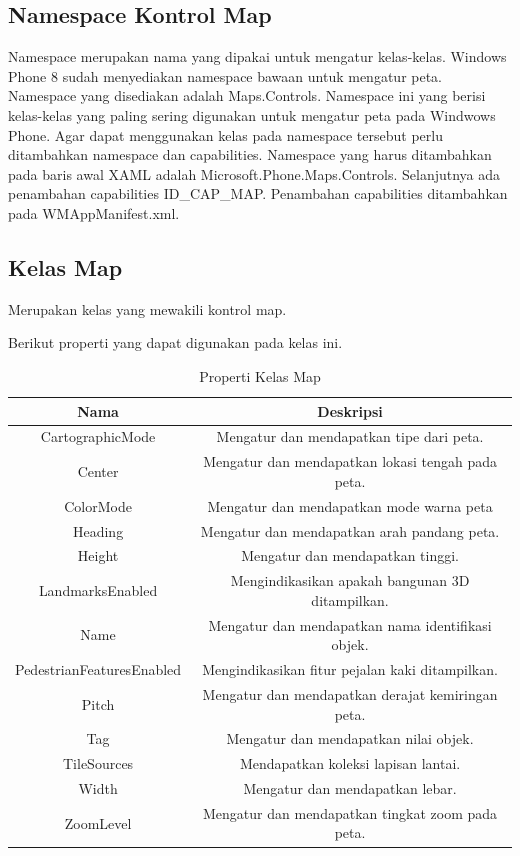 \subsection{Namespace Kontrol Map}
\label{subsec:Namespace Kontrol Map}
\hspace{0.5cm} Namespace merupakan nama yang dipakai untuk mengatur kelas-kelas. Windows Phone 8 sudah menyediakan namespace bawaan untuk mengatur peta. Namespace yang disediakan adalah Maps.Controls. Namespace ini yang berisi kelas-kelas yang paling sering digunakan untuk mengatur peta pada Windwows Phone.  Agar dapat menggunakan kelas pada namespace tersebut perlu ditambahkan namespace dan capabilities. Namespace yang harus ditambahkan pada baris awal XAML adalah Microsoft.Phone.Maps.Controls. Selanjutnya ada penambahan capabilities ID\_CAP\_MAP. Penambahan capabilities ditambahkan pada WMAppManifest.xml.

\subsection{Kelas Map}
\label{subsec:Kelas Map}
\hspace{0.5cm} Merupakan kelas yang mewakili kontrol map.

Berikut properti yang dapat digunakan pada kelas ini.
\begin{table}[h]
	\centering
		\begin{tabular}{ |c||c|}
				\hline
					Nama & Deskripsi \\ \hline
					CartographicMode & Mengatur dan mendapatkan tipe dari peta. \\ \hline
					Center & Mengatur dan mendapatkan lokasi tengah pada peta. \\ \hline
					ColorMode & Mengatur dan mendapatkan mode warna peta \\ \hline
					Heading & Mengatur dan mendapatkan arah pandang peta. \\ \hline
					Height & Mengatur dan mendapatkan tinggi. \\ \hline
					LandmarksEnabled & Mengindikasikan apakah bangunan 3D ditampilkan. \\ \hline
					Name & Mengatur dan mendapatkan nama identifikasi objek. \\ \hline
					PedestrianFeaturesEnabled & Mengindikasikan fitur pejalan kaki ditampilkan. \\ \hline
					Pitch & Mengatur dan mendapatkan derajat kemiringan peta. \\ \hline
					Tag & Mengatur dan mendapatkan nilai objek. \\ \hline
					TileSources & Mendapatkan koleksi lapisan lantai. \\ \hline
					Width & Mengatur dan mendapatkan lebar. \\ \hline
					ZoomLevel & Mengatur dan mendapatkan tingkat zoom pada peta. \\ \hline
				\hline
		\end{tabular}
	\caption{Properti Kelas Map}
	\label{tab:PropertiKelasMap}
\end{table}

